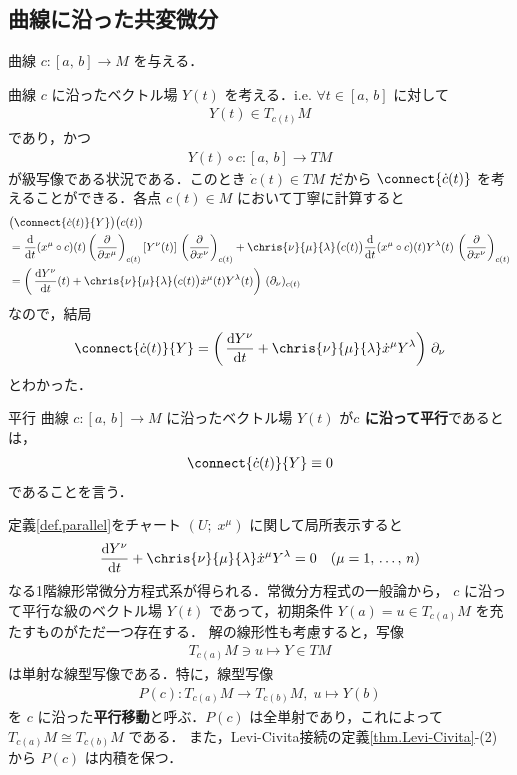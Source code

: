 \documentclass[geometry_main]{subfiles}
\begin{document}
\subsection{曲線に沿った共変微分}

\cinfty 曲線 $c\colon [a,\, b] \to M$ を与える．

\cinfty 曲線 $c$ に沿ったベクトル場 $Y(t)$ を考える．i.e. $\forall t \in [a,\, b]$ に対して
\begin{align} 
	Y(t) \in T_{c(t)} M
\end{align}
であり，かつ
\begin{align}
	Y(t) \circ c \colon [a,\, b] \to TM
\end{align}
が\cinfty 級写像である状況である．このとき $\dot{c}(t) \in TM$ だから $\connect{\dot{c}(t)}$ を考えることができる．各点 $c(t) \in M$ において丁寧に計算すると
\begin{align} 
	&\bigl(\connect{\dot{c}(t)}{Y}\bigr)\bigl( c(t) \bigr) \\
	&= \dv{}{t}()(x^\mu \circ c)(t) \left(\pdv{}{x^\mu}\right)_{c(t)} [Y^\nu (t)]\, \left(\pdv{}{x^\nu}\right)_{c(t)} + \chris{\nu}{\mu}{\lambda} \bigl( c(t) \bigr)  \dv{}{t}()(x^\mu \circ c)(t) Y^\lambda(t) \, \left(\pdv{}{x^\nu}\right)_{c(t)} \\
	&= \left(\, \dv{Y^\nu}{t}()(t) + \chris{\nu}{\mu}{\lambda} \bigl( c(t) \bigr) \dot{x}^\mu (t) Y^\lambda(t)\right)\, (\partial_\nu)_{c(t)}
\end{align}
なので，結局
\begin{align} 
	\connect{\dot{c}(t)}{Y} = \left(\, \dv{Y^\nu}{t} + \chris{\nu}{\mu}{\lambda} \dot{x}^\mu Y^\lambda\right)\, \partial_\nu
\end{align}
とわかった．

\begin{mydef}[label=def.parallel]{平行}
	\cinfty 曲線 $c \colon [a,\, b] \to M$ に沿ったベクトル場 $Y(t)$ が\textbf{$c$ に沿って平行}であるとは，
	\begin{align} 
		\connect{\dot{c}(t)}{Y} \equiv 0
	\end{align}
	であることを言う．
\end{mydef}

定義\ref{def.parallel}をチャート $(U;\; x^\mu)$ に関して局所表示すると
\begin{align} 
	\dv{Y^\nu}{t} + \chris{\nu}{\mu}{\lambda} \dot{x}^\mu Y^\lambda = 0\quad (\mu = 1,\, \dots ,\, n)
\end{align}
なる1階線形常微分方程式系が得られる．常微分方程式の一般論から，
$c$ に沿って平行な\cinfty 級のベクトル場 $Y(t)$ であって，初期条件 $Y(a) = u \in T_{c(a)}M$ を充たすものがただ一つ存在する．
解の線形性も考慮すると，写像
\begin{align} 
	T_{c(a)}M \ni u \mapsto Y \in TM
\end{align}
は単射な線型写像である．特に，線型写像
\begin{align} 
	P(c) \colon T_{c(a)}M \to T_{c(b)}M,\; u \mapsto Y(b)
\end{align}
を $c$ に沿った\textbf{平行移動}と呼ぶ．$P(c)$ は全単射であり，これによって $T_{c(a)}M \cong T_{c(b)}M$ である．
また，Levi-Civita接続の定義\ref{thm.Levi-Civita}-(2) から $P(c)$ は内積を保つ．
\end{document}

